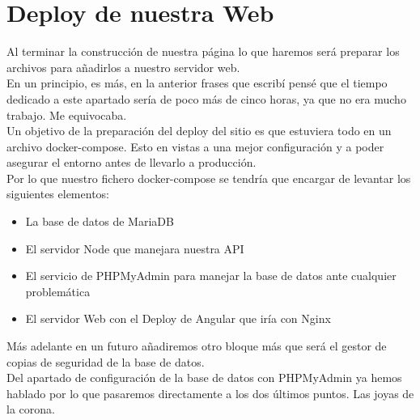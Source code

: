 \chapter{Deploy de nuestra Web}
Al terminar la construcción de nuestra página lo que haremos será preparar los archivos para añadirlos a nuestro servidor web.
\\En un principio, es más, en la anterior frases que escribí pensé que el tiempo dedicado a este apartado sería de poco más de cinco horas, ya que no era mucho trabajo. Me equivocaba.
\\Un objetivo de la preparación del deploy del sitio es que estuviera todo en un archivo docker-compose. Esto en vistas a una mejor configuración y a poder asegurar el entorno antes de llevarlo a producción.
\\Por lo que nuestro fichero docker-compose se tendría que encargar de levantar los siguientes elementos:

\begin{itemize}
    \item La base de datos de MariaDB
    \item El servidor Node que manejara nuestra API
    \item El servicio de PHPMyAdmin para manejar la base de datos ante cualquier problemática
    \item El servidor Web con el Deploy de Angular que iría con Nginx
\end{itemize}

Más adelante en un futuro añadiremos otro bloque más que será el gestor de copias de seguridad de la base de datos.
\\Del apartado de configuración de la base de datos con PHPMyAdmin ya hemos hablado por lo que pasaremos directamente a los dos últimos puntos. Las joyas de la corona.

